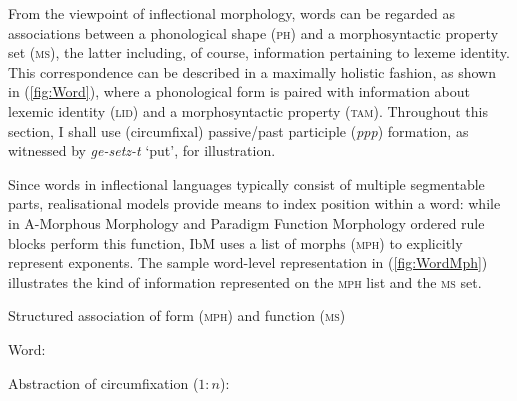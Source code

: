 \documentclass[output=paper
 	        ,biblatex
                ,babelshorthands
                ,newtxmath
                ,draftmode
                ,colorlinks, citecolor=brown
]{langscibook}
\begin{document}
\begin{exe}
\begin{xlist}
\begin{exe}
\end{exe}

From the viewpoint of inflectional morphology, words can be regarded
as associations between a phonological shape (\textsc{ph}) and a
morphosyntactic property set (\textsc{ms}), the latter including, of
course, information pertaining to lexeme identity. This correspondence
can be described in a maximally holistic fashion, as shown in 
(\ref{fig:Word}), where a phonological form is paired with information
about lexemic identity (\textsc{lid}) and a morphosyntactic property (\textsc{tam}). Throughout this section, I shall use 
(circumfixal) passive/past participle (\emph{ppp}) formation, as
witnessed by \textit{ge-\emph{setz}-t} `put', for illustration.

\begin{exe}
  \ex
  
  \label{fig:Word}
\end{exe}

Since words in inflectional languages typically consist of multiple
segment\-able parts, realisational models provide means to index
position within a word: while in A-Morphous Morphology
\citep[=AM;][]{Anderson92} and Paradigm Function Morphology
\citep[=PFM;][]{Stump01} ordered rule blocks perform this function, IbM
uses a list of morphs (\textsc{mph}) to explicitly represent
exponents.
The sample word-level representation in (\ref{fig:WordMph})
illustrates the kind of information represented on the \textsc{mph}
list and the \textsc{ms} set. 
\begin{exe}
  \ex Structured association of form (\textsc{mph}) and function (\textsc{ms})   \label{fig:WordMph}

  \begin{xlist}
    \ex Word:

    \ex Abstraction of circumfixation ($1:n$):


\end{xlist}
\end{exe}
\end{xlist}
\end{exe}
\end{document}
